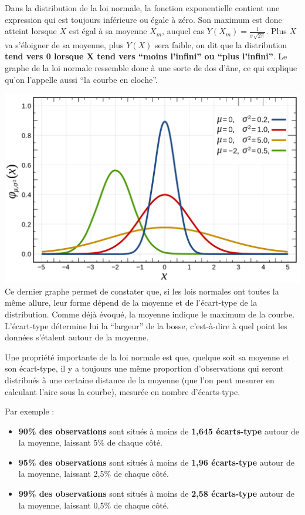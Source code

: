 \documentclass[
  french,
]{book}
\providecommand{\tightlist}{%
  \setlength{\itemsep}{0pt}\setlength{\parskip}{0pt}}
\begin{document}
Dans la distribution de la loi normale, la fonction exponentielle contient une expression qui est toujours inférieure ou égale à zéro. Son maximum est donc atteint lorsque \(X\) est égal à sa moyenne \(X_m\), auquel cas \(Y(X_m) = \frac{1}{ \sigma \sqrt{2\pi}}\). Plus \(X\) va s'éloigner de sa moyenne, plus \(Y(X)\) sera faible, on dit que la distribution \textbf{tend vers 0 lorsque X tend vers ``moins l'infini'' ou ``plus l'infini''}. Le graphe de la loi normale ressemble donc à une sorte de dos d'âne, ce qui explique qu'on l'appelle aussi ``la courbe en cloche''.

\includegraphics{images/loisnormales.png} Ce dernier graphe permet de constater que, si les lois normales ont toutes la même allure, leur forme dépend de la moyenne et de l'écart-type de la distribution. Comme déjà évoqué, la moyenne indique le maximum de la courbe. L'écart-type détermine lui la ``largeur'' de la bosse, c'est-à-dire à quel point les données s'étalent autour de la moyenne.

Une propriété importante de la loi normale est que, quelque soit sa moyenne et son écart-type, il y a toujours une même proportion d'observations qui seront distribués à une certaine distance de la moyenne (que l'on peut mesurer en calculant l'aire sous la courbe), mesurée en nombre d'écarts-type.

Par exemple :

\begin{itemize}
\tightlist
\item
  \textbf{90\% des observations} sont situés à moins de \textbf{1,645 écarts-type} autour de la moyenne, laissant 5\% de chaque côté.
\item
  \textbf{95\% des observations} sont situés à moins de \textbf{1,96 écarts-type} autour de la moyenne, laissant 2,5\% de chaque côté.
\item
  \textbf{99\% des observations} sont situés à moins de \textbf{2,58 écarts-type} autour de la moyenne, laissant 0,5\% de chaque côté.
\end{itemize}
\end{document}
